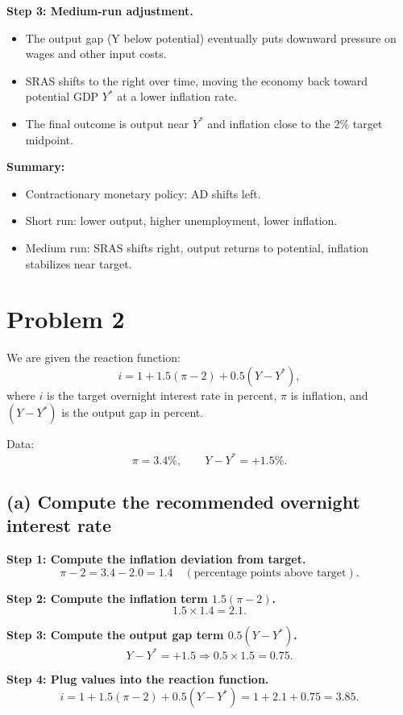 \documentclass[12pt]{article}
\begin{document}
\textbf{Step 3: Medium-run adjustment.}
\begin{itemize}
    \item The output gap (Y below potential) eventually puts downward pressure on wages and other input costs.
    \item SRAS shifts to the right over time, moving the economy back toward potential GDP $Y^*$ at a lower inflation rate.
    \item The final outcome is output near $Y^*$ and inflation close to the 2\% target midpoint.
\end{itemize}

\textbf{Summary:}
\begin{itemize}
    \item Contractionary monetary policy: AD shifts left.
    \item Short run: lower output, higher unemployment, lower inflation.
    \item Medium run: SRAS shifts right, output returns to potential, inflation stabilizes near target.
\end{itemize}



\section*{Problem 2}

We are given the reaction function:
\[
i = 1 + 1.5(\pi - 2) + 0.5(Y - Y^*),
\]
where $i$ is the target overnight interest rate in percent, $\pi$ is inflation, and $(Y - Y^*)$ is the output gap in percent.

Data:
\[
\pi = 3.4\%, \qquad Y - Y^* = +1.5\%.
\]

\subsection*{(a) Compute the recommended overnight interest rate}

\textbf{Step 1: Compute the inflation deviation from target.}
\[
\pi - 2 = 3.4 - 2.0 = 1.4 \quad (\text{percentage points above target}).
\]

\textbf{Step 2: Compute the inflation term $1.5(\pi - 2)$.}
\[
1.5 \times 1.4 = 2.1.
\]

\textbf{Step 3: Compute the output gap term $0.5(Y - Y^*)$.}
\[
Y - Y^* = +1.5 \Rightarrow 0.5 \times 1.5 = 0.75.
\]

\textbf{Step 4: Plug values into the reaction function.}
\[
i = 1 + 1.5(\pi - 2) + 0.5(Y - Y^*) 
= 1 + 2.1 + 0.75 = 3.85.
\]
\end{document}
